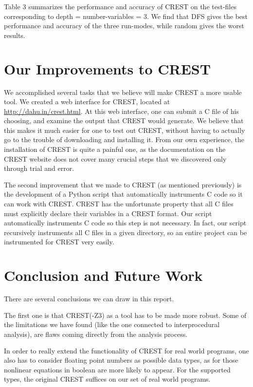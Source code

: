 \documentclass[oribibl, twocolumn]{llncs}
\begin{document}
Table 3 summarizes the performance and accuracy of CREST on the test-files corresponding to depth = number-variables = 3. We find that DFS gives the best performance and accuracy of the three run-modes, while random gives the worst results.

\section{Our Improvements to CREST}
\label{sctn:Improvements}
We accomplished several tasks that we believe will make CREST a more usable tool. We created a web interface for CREST, located at \url{http://dahu.in/crest.html}. At this web interface, one can submit a C file of his choosing, and examine the output that CREST would generate. We believe that this makes it much easier for one to test out CREST, without having to actually go to the trouble of downloading and installing it. From our own experience, the installation of CREST is quite a painful one, as the documentation on the CREST website does not cover many crucial steps that we discovered only through trial and error.

The second improvement that we made to CREST (as mentioned previously) is the development of a Python script that automatically instruments C code so it can work with CREST. CREST has the unfortunate property that all C files must explicitly declare their variables in a CREST format. Our script automatically instruments C code so this step is not necessary. In fact, our script recursively instruments all C files in a given directory, so an entire project can be instrumented for CREST very easily.


\section{Conclusion and Future Work}
\label{sctn:Conclusion}

There are several conclusions we can draw in this report.

The first one is that \textsc{CREST(-Z3)} as a tool has to be made more robust. Some of the limitations we have found (like the one connected to interprocedural analysis), are flaws coming directly from the analysis process.

In order to really extend the functionality of \textsc{CREST} for real world programs, one also has to consider floating point numbers as possible data types, as for those nonlinear equations in boolean are more likely to appear. For the supported types, the original \textsc{CREST} suffices on our set of real world programs.
\end{document}
